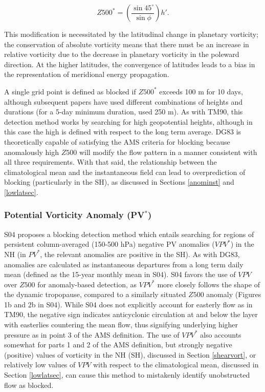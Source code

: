 \documentclass[smallextended]{svjour3}       %
\numberwithin{equation}{section}
\begin{document}
\begin{equation}
Z500^\ast = \left(\frac{\sin 45^\circ}{\sin \phi}\right)h'.
\end{equation}

\noindent This modification is necessitated by the latitudinal change in planetary vorticity; the conservation of absolute vorticity means that there must be an increase in relative vorticity due to the decrease in planetary vorticity in the poleward direction. At the higher latitudes, the convergence of latitudes leads to a bias in the representation of meridional energy propagation. 

A single grid point is defined as blocked if $Z500^*$ exceeds 100 m for 10 days, although subsequent papers have used different combinations of heights and durations (for a 5-day minimum duration, \cite{sausen_analysis_1995} used 250 m). As with TM90, this detection method works by searching for high geopotential heights, although in this case the high is defined with respect to the long term average. DG83 is theoretically capable of satisfying the AMS criteria for blocking because anomalously high $Z500$ will modify the flow pattern in a manner consistent with all three requirements. With that said, the relationship between the climatological mean and the instantaneous field can lead to overprediction of blocking (particularly in the SH), as discussed in Sections \ref{anominst} and \ref{lowlatsec}. 

\subsubsection{Potential Vorticity Anomaly (PV$^\ast$)}\label{pvanomdesc}

S04 proposes a blocking detection method which entails searching for regions of persistent column-averaged (150-500 hPa) negative PV anomalies ($VPV^*$) in the NH (in $PV^*$, the relevant anomalies are positive in the SH). As with DG83, anomalies are calculated as instantaneous departures from a long term daily mean (defined as the 15-year monthly mean in S04). S04 favors the use of $VPV$ over $Z500$ for anomaly-based detection, as $VPV^*$ more closely follows the shape of the dynamic tropopause, compared to a similarly situated $Z500$ anomaly (Figures 1b and 2b in S04). While S04 does not explicitly account for easterly flow as in TM90, the negative sign indicates anticyclonic circulation at and below the layer with easterlies countering the mean flow, thus signifying underlying higher pressure as in point 3 of the AMS definition. The use of $VPV^*$ also accounts somewhat for parts 1 and 2 of the AMS definition, but strongly negative (positive) values of vorticity in the NH (SH), discussed in Section \ref{shearvort}, or relatively low values of $VPV$ with respect to the climatological mean, discussed in Section \ref{lowlatsec}, can cause this method to mistakenly identify unobstructed flow as blocked.
\end{document}
